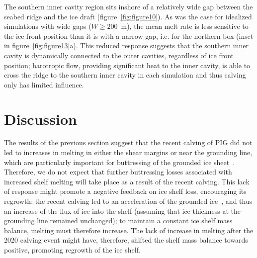 \documentclass[draft]{agujournal2019}
\begin{document}

The southern inner cavity region sits inshore of a relatively wide gap between the seabed ridge and the ice draft (figure~\ref{fig:figure10}). As was the case for idealized simulations with wide gaps ($W\geq200$~m), the mean melt rate is less sensitive to the ice front position than it is with a narrow gap, i.e. for the northern box (inset in figure~\ref{fig:figure13}a). This reduced response suggests that the southern inner cavity is dynamically connected to the outer cavities, regardless of ice front position; barotropic flow, providing significant heat to the inner cavity, is able to cross the ridge to the southern inner cavity in each simulation and thus calving only has limited influence. 



\section{Discussion}\label{S:Discussion}
The results of the previous section suggest that the recent calving of PIG did not led to increases in melting in either the shear margins or near the grounding line, which are particularly important for buttressing of the grounded ice sheet~\cite{Reese2018NatureClimCh}. Therefore, we do not expect that further buttressing losses associated with increased shelf melting will take place as a result of the recent calving. This lack of response might promote a negative feedback on ice shelf loss, encouraging its regrowth: the recent calving led to an acceleration of the grounded ice~\cite{Joughin2021ScienceAdv}, and thus an increase of the flux of ice into the shelf (assuming that ice thickness at the grounding line remained unchanged); to maintain a constant ice shelf mass balance, melting must therefore increase. The lack of increase in melting after the 2020 calving event might have, therefore, shifted the shelf mass balance towards positive, promoting regrowth of the ice shelf.
\end{document}

